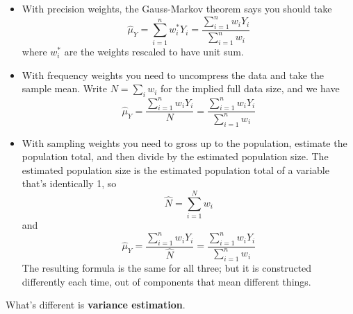 \documentclass[fleqn,10pt]{latex/stylish_article} %
\providecommand{\tightlist}{%
  \setlength{\itemsep}{0pt}\setlength{\parskip}{0pt}}
\begin{document}
\begin{itemize}
\tightlist
\item
  With precision weights, the Gauss-Markov theorem says you should take
  \[
  \hat \mu_Y =\sum_{i=1}^n w_i^*Y_i= \frac{\sum_{i=1}^n w_iY_i}{\sum_{i=1}^n w_i}
  \]
  where \(w_i^*\) are the weights rescaled to have unit sum.
\item
  With frequency weights you need to uncompress the data and take the sample mean. Write \(N=\sum_i w_i\)
  for the implied full data size, and we have
  \[
   \hat \mu_Y  = \frac{\sum_{i=1}^n w_iY_i}{N}= \frac{\sum_{i=1}^n w_iY_i}{\sum_{i=1}^n w_i}
   \]
\item
  With sampling weights you need to gross up to the population, estimate the population total, and then divide by the estimated population size. The estimated population size is the estimated population total of a variable that's identically 1, so
  \[ 
  \hat N = \sum_{i=1}^N w_i
  \]
  and
  \[
  \hat \mu_Y  = \frac{\sum_{i=1}^n w_iY_i}{\hat N}= \frac{\sum_{i=1}^n w_iY_i}{\sum_{i=1}^n w_i}
  \]
  The resulting formula is the same for all three; but it is constructed differently each time, out of components that mean different things.
\end{itemize}

What's different is \textbf{variance estimation}.
\end{document}
